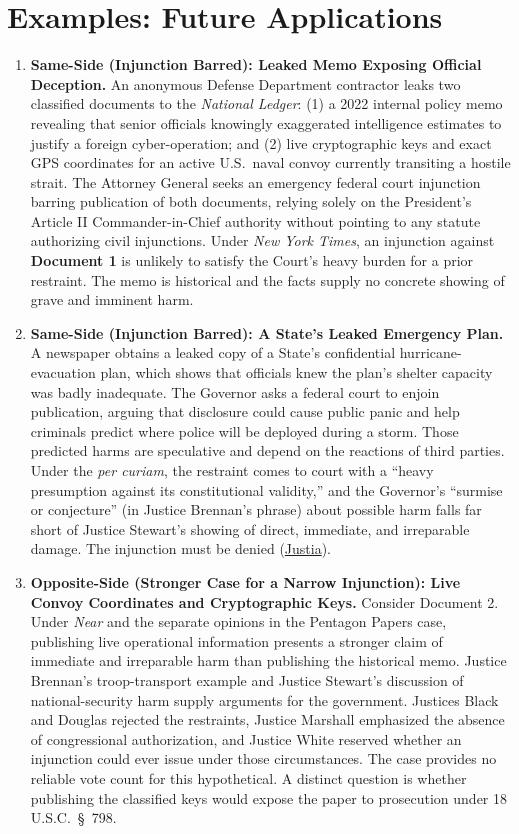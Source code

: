 \documentclass[12pt]{article}
\begin{document}
\section{Examples: Future Applications}
\begin{enumerate}

\item \textbf{Same-Side (Injunction Barred): Leaked Memo Exposing Official Deception.} An anonymous Defense Department contractor leaks two classified documents to the \textit{National Ledger}: (1) a 2022 internal policy memo revealing that senior officials knowingly exaggerated intelligence estimates to justify a foreign cyber-operation; and (2) live cryptographic keys and exact GPS coordinates for an active U.S.\ naval convoy currently transiting a hostile strait. The Attorney General seeks an emergency federal court injunction barring publication of both documents, relying solely on the President's Article II Commander-in-Chief authority without pointing to any statute authorizing civil injunctions. Under \textit{New York Times}, an injunction against \textbf{Document 1} is unlikely to satisfy the Court's heavy burden for a prior restraint. The memo is historical and the facts supply no concrete showing of grave and imminent harm.

\item \textbf{Same-Side (Injunction Barred): A State's Leaked Emergency Plan.} A newspaper obtains a leaked copy of a State's confidential hurricane-evacuation plan, which shows that officials knew the plan's shelter capacity was badly inadequate. The Governor asks a federal court to enjoin publication, arguing that disclosure could cause public panic and help criminals predict where police will be deployed during a storm. Those predicted harms are speculative and depend on the reactions of third parties. Under the \textit{per curiam}, the restraint comes to court with a ``heavy presumption against its constitutional validity,'' and the Governor's ``surmise or conjecture'' (in Justice Brennan's phrase) about possible harm falls far short of Justice Stewart's showing of direct, immediate, and irreparable damage. The injunction must be denied (\href{https://supreme.justia.com/cases/federal/us/403/713/}{Justia}).

\item \textbf{Opposite-Side (Stronger Case for a Narrow Injunction): Live Convoy Coordinates and Cryptographic Keys.} Consider Document 2. Under \textit{Near} and the separate opinions in the Pentagon Papers case, publishing live operational information presents a stronger claim of immediate and irreparable harm than publishing the historical memo. Justice Brennan's troop-transport example and Justice Stewart's discussion of national-security harm supply arguments for the government. Justices Black and Douglas rejected the restraints, Justice Marshall emphasized the absence of congressional authorization, and Justice White reserved whether an injunction could ever issue under those circumstances. The case provides no reliable vote count for this hypothetical. A distinct question is whether publishing the classified keys would expose the paper to prosecution under 18 U.S.C.\ \S~798.


\end{enumerate}
\end{document}

